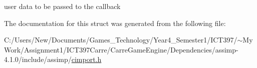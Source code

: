 user data to be passed to the callback 

The documentation for this struct was generated from the following file:\begin{CompactItemize}
\item 
C:/Users/New/Documents/Games\_\-Technology/Year4\_\-Semester1/ICT397/$\sim$My Work/Assignment1/ICT397Carre/CarreGameEngine/Dependencies/assimp-4.1.0/include/assimp/\hyperlink{cimport_8h}{cimport.h}\end{CompactItemize}
